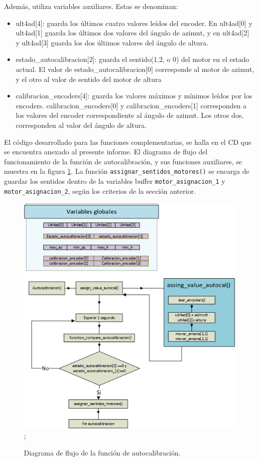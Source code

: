 Además, utiliza variables auxiliares. Estas se denominan: 
\begin{itemize}
	\item ult4ad[4]: guarda los últimos cuatro valores leídos del encoder. En ult4ad[0] y ult4ad[1] guarda los últimos dos valores del ángulo de azimut, y en ult4ad[2] y ult4ad[3] guarda los dos últimos valores del ángulo de altura. 
	\item estado\_autocalibracion[2]: guarda el sentido(1,2, o 0) del motor en el estado actual. El valor de estado\_autocalibracion[0] corresponde al motor de azimut, y el otro al valor de sentido del motor de altura 
	\item calibracion\_encoders[4]: guarda los valores máximos y mínimos leídos por los encoders. calibracion\_encoders[0] y calibracion\_encoders[1] corresponden a los valores del encoder correspondiente al ángulo de azimut. Los otros dos, corresponden al valor del ángulo de altura.   
\end{itemize}

El código desarrollado para las funciones complementarias, se halla en el CD que se encuentra anexado al presente informe. El diagrama de flujo del funcionamiento de la función de autocalibración, y sus funciones auxiliares, se muestra en la figura \ref{fig:flujo_autocalibracion}. La función \texttt{assignar_sentidos_motores()} se encarga de guardar los sentidos dentro de la variables buffer \texttt{motor_asignacion_1} y \texttt{motor_asignacion_2}, según los criterios de la sección anterior. 
\vspace{15mm}
\begin{figure}[ht]
	\centering
	\includegraphics{flujo_autocal} ; 
	\caption{Diagrama de flujo de la función de autocalibración.}
	\label{fig:flujo_autocalibracion}
\end{figure}

